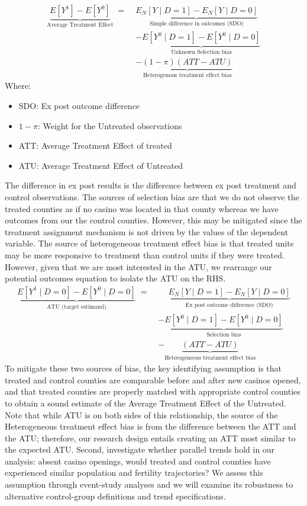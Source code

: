 \documentclass[12pt]{article}
\begin{document}
\begin{align*}
\underbrace{E[Y^1] - E[Y^0]}_{\text{Average Treatment Effect}}
\;=\;
& \underbrace{E_N[Y \mid D = 1] - E_N[Y \mid D = 0]}_{\text{Simple difference in outcomes (SDO)}} \\
& - \underbrace{E[Y^0 \mid D = 1] - E[Y^0 \mid D = 0]}_{\text{Unknown Selection bias}} \\[4pt]
& - \underbrace{(1 - \pi)(ATT - ATU)}_{\text{Heterogenous treatment effect bias}}
\end{align*}
Where:
\begin{itemize}
\item SDO: Ex post outcome difference
\item $1-\pi$: Weight for the Untreated observations 
\item ATT: Average Treatment Effect of treated
\item ATU: Average Treatment Effect of Untreated
\end{itemize}
The difference in ex post results is the difference between ex post treatment and control observations. The sources of selection bias are that we do not observe the treated counties as if no casino was located in that county whereas we have outcomes from our the control counties.  However, this may be mitigated since the treatment assignment mechanism is not driven by the values of the dependent variable. The source of heterogeneous treatment effect bias is that treated units may be more responsive to treatment than control units if they were treated.
However, given that we are most interested in the ATU, we rearrange our potential outcomes equation to isolate the ATU on the RHS. 
\begin{align*}
\underbrace{E[Y^1 \mid D = 0] - E[Y^0 \mid D = 0]}_{\text{ATU (target estimand)}} 
\;=\; & \phantom{+}\underbrace{E_N[Y \mid D = 1] - E_N[Y \mid D = 0]}_{\text{Ex post outcome difference (SDO)}}\\
& - \underbrace{E[Y^0 \mid D = 1] - E[Y^0 \mid D = 0]}_{\text{Selection bias}} \\[4pt]
& - \underbrace{(ATT - ATU)}_{\text{Heterogeneous treatment effect bias}}
\end{align*}
 To mitigate these two sources of bias, the key identifying assumption is that treated and control counties are comparable before and after new casinos opened, and that treated counties are properly matched with appropriate control counties to obtain a sound estimate of the Average Treatment Effect of the Untreated. Note that while ATU is on both sides of this relationship, the source of the Heterogeneous treatment effect bias is from the difference between the ATT and the ATU; therefore, our research design entails creating an ATT most similar to the expected ATU. Second, investigate whether parallel trends hold in our analysis: absent casino openings, would treated and control counties have experienced similar population and fertility trajectories? We assess this assumption through event-study analyses and we will examine its robustness to alternative control-group definitions and trend specifications.
 
\end{document}
